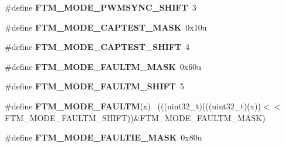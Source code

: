 \begin{DoxyCompactItemize}
\item 
\hypertarget{group___f_t_m___register___masks_ga5e9f1c44632b559046173b3b0db93170}{}\#define {\bfseries F\+T\+M\+\_\+\+M\+O\+D\+E\+\_\+\+P\+W\+M\+S\+Y\+N\+C\+\_\+\+S\+H\+I\+F\+T}~3\label{group___f_t_m___register___masks_ga5e9f1c44632b559046173b3b0db93170}

\item 
\hypertarget{group___f_t_m___register___masks_ga24f1ea5d7afd4ec88404e4867303aae5}{}\#define {\bfseries F\+T\+M\+\_\+\+M\+O\+D\+E\+\_\+\+C\+A\+P\+T\+E\+S\+T\+\_\+\+M\+A\+S\+K}~0x10u\label{group___f_t_m___register___masks_ga24f1ea5d7afd4ec88404e4867303aae5}

\item 
\hypertarget{group___f_t_m___register___masks_gab95eb2088da81d610805b949399d9bf9}{}\#define {\bfseries F\+T\+M\+\_\+\+M\+O\+D\+E\+\_\+\+C\+A\+P\+T\+E\+S\+T\+\_\+\+S\+H\+I\+F\+T}~4\label{group___f_t_m___register___masks_gab95eb2088da81d610805b949399d9bf9}

\item 
\hypertarget{group___f_t_m___register___masks_ga8a3aedea37d5334fda2212d1f1424ce4}{}\#define {\bfseries F\+T\+M\+\_\+\+M\+O\+D\+E\+\_\+\+F\+A\+U\+L\+T\+M\+\_\+\+M\+A\+S\+K}~0x60u\label{group___f_t_m___register___masks_ga8a3aedea37d5334fda2212d1f1424ce4}

\item 
\hypertarget{group___f_t_m___register___masks_ga64d6ed5f33ee34eccdb66956a0bc1224}{}\#define {\bfseries F\+T\+M\+\_\+\+M\+O\+D\+E\+\_\+\+F\+A\+U\+L\+T\+M\+\_\+\+S\+H\+I\+F\+T}~5\label{group___f_t_m___register___masks_ga64d6ed5f33ee34eccdb66956a0bc1224}

\item 
\hypertarget{group___f_t_m___register___masks_ga3a375ca71447009a74bac03c360772fc}{}\#define {\bfseries F\+T\+M\+\_\+\+M\+O\+D\+E\+\_\+\+F\+A\+U\+L\+T\+M}(x)                                          ~(((uint32\+\_\+t)(((uint32\+\_\+t)(x))$<$$<$F\+T\+M\+\_\+\+M\+O\+D\+E\+\_\+\+F\+A\+U\+L\+T\+M\+\_\+\+S\+H\+I\+F\+T))\&F\+T\+M\+\_\+\+M\+O\+D\+E\+\_\+\+F\+A\+U\+L\+T\+M\+\_\+\+M\+A\+S\+K)\label{group___f_t_m___register___masks_ga3a375ca71447009a74bac03c360772fc}

\item 
\hypertarget{group___f_t_m___register___masks_gab5bf6d3a31e69bc7806947c4650afa90}{}\#define {\bfseries F\+T\+M\+\_\+\+M\+O\+D\+E\+\_\+\+F\+A\+U\+L\+T\+I\+E\+\_\+\+M\+A\+S\+K}~0x80u\label{group___f_t_m___register___masks_gab5bf6d3a31e69bc7806947c4650afa90}


\end{DoxyCompactItemize}
